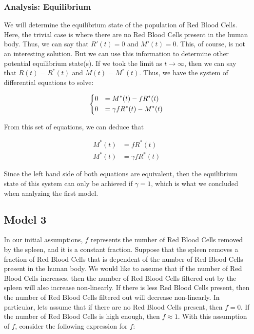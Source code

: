 \subsubsection{Analysis: Equilibrium}

We will determine the equilibrium state of the population of Red Blood Cells. Here, the trivial case is where there are no Red Blood Cells present in the human body. Thus, we can say that $R'(t) = 0$ and $M'(t) = 0$. This, of course, is not an interesting solution. But we can use this information to determine other potential equilibrium state(s). If we took the limit as $t\to\infty$, then we can say that $R(t) = R^\ast(t)$ and $M(t) = M^\ast(t)$. Thus, we have the system of differential equations to solve:

\begin{equation*}
    \begin{dcases}
        0 &= M^\ast(t)-fR^\ast(t)\\
        0 &= \gamma fR^\ast(t) - M^\ast(t)
    \end{dcases}
\end{equation*}

From this set of equations, we can deduce that

\begin{align*}
    M^\ast(t) &= fR^\ast(t)\\
    M^\ast(t) &= \gamma fR^\ast(t)
\end{align*}

Since the left hand side of both equations are equivalent, then the equilibrium state of this system can only be achieved if $\gamma = 1$, which is what we concluded when analyzing the first model.

\subsection{Model 3}
\label{subsec:model-3}

In our initial assumptions, $f$ represents the number of Red Blood Cells removed by the spleen, and it is a constant fraction. Suppose that the spleen removes a fraction of Red Blood Cells that is dependent of the number of Red Blood Cells present in the human body. We would like to assume that if the number of Red Blood Cells increases, then the number of Red Blood Cells filtered out by the spleen will also increase non-linearly. If there is less Red Blood Cells present, then the number of Red Blood Cells filtered out will decrease non-linearly. In particular, lets assume that if there are no Red Blood Cells present, then $f=0$. If the number of Red Blood Cells is high enough, then $f \approx 1$. With this assumption of $f$, consider the following expression for $f$:

